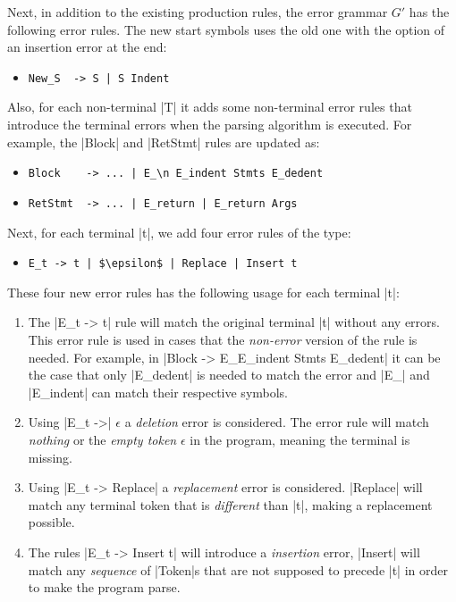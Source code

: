 Next, in addition to the existing production rules, the error grammar $G'$ has
the following error rules. The new start symbols uses the old one with the
option of an insertion error at the end:
\begin{itemize}
  \item \lstinline{New_S  -> S | S Indent}
\end{itemize}
Also, for each non-terminal |T| it adds some non-terminal error rules that
introduce the terminal errors when the parsing algorithm is executed. For
example, the |Block| and |RetStmt| rules are updated as:
\begin{itemize}
  \item \lstinline{Block    -> ... | E_\n E_indent Stmts E_dedent}
  \item \lstinline{RetStmt  -> ... | E_return | E_return Args}
\end{itemize}
Next, for each terminal |t|, we add four error rules of the type:
\begin{itemize}
  \item \lstinline{E_t -> t | $\epsilon$ | Replace | Insert t}
\end{itemize}
These four new error rules has the following usage for each terminal |t|:
\begin{enumerate}
  \item The |E_t -> t| rule will match the original terminal |t| without any
  errors. This error rule is used in cases that the \emph{non-error} version of
  the rule is needed. For example, in \break
  |Block -> E_\n E_indent Stmts E_dedent| it can be the case that only
  |E_dedent| is needed to match the error and |E_\n| and |E_indent| can match
  their respective symbols.
  \item Using |E_t ->| $\epsilon$ a \emph{deletion} error is considered. The
  error rule will match \emph{nothing} or the \emph{empty token} $\epsilon$ in
  the program, meaning the terminal is missing.
  \item Using |E_t -> Replace| a \emph{replacement} error is considered.
  |Replace| will match any terminal token that is \emph{different} than |t|,
  making a replacement possible.
  \item  The rules |E_t -> Insert t| will introduce a \emph{insertion} error,
  \ie |Insert| will match any \emph{sequence} of |Token|s that are not supposed
  to precede |t| in order to make the program parse.
\end{enumerate}
